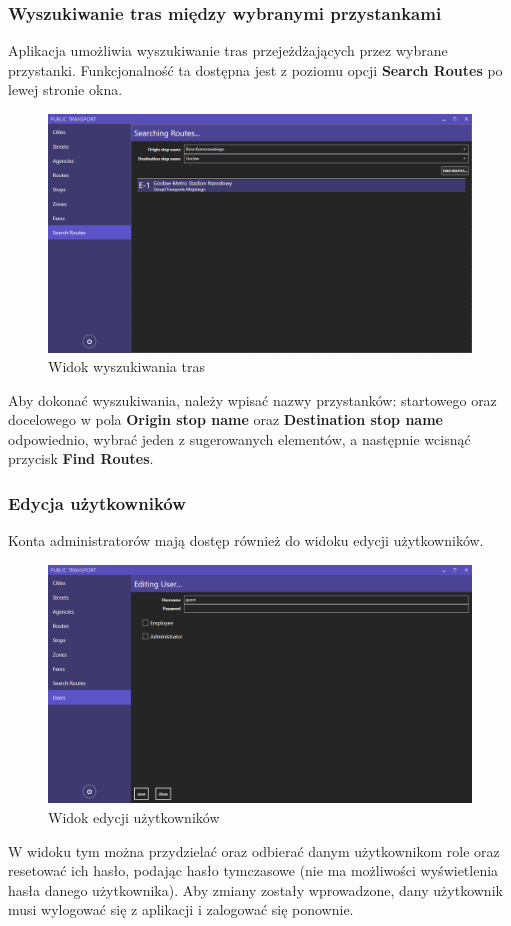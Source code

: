 \documentclass[10pt,a4paper]{article}
\begin{document}
\subsubsection{Wyszukiwanie tras między wybranymi przystankami}
Aplikacja umożliwia wyszukiwanie tras przejeżdżających przez wybrane przystanki. Funkcjonalność ta dostępna jest z poziomu opcji \textbf{Search Routes} po lewej stronie okna.
\begin{figure}[H]
	\centering
	\includegraphics[width=15cm]{screenshots/23_search_routes.PNG}
	\caption{Widok wyszukiwania tras}
\end{figure}
Aby dokonać wyszukiwania, należy wpisać nazwy przystanków: startowego oraz docelowego w pola \textbf{Origin stop name} oraz \textbf{Destination stop name} odpowiednio, wybrać jeden z sugerowanych elementów, a następnie wcisnąć przycisk \textbf{Find Routes}.

\subsubsection{Edycja użytkowników}
Konta administratorów mają dostęp również do widoku edycji użytkowników.
\begin{figure}[H]
	\centering
	\includegraphics[width=15cm]{screenshots/19_edit_user.png}
	\caption{Widok edycji użytkowników}
\end{figure}
W widoku tym można przydzielać oraz odbierać danym użytkownikom role oraz resetować ich hasło, podając hasło tymczasowe (nie ma możliwości wyświetlenia hasła danego użytkownika). Aby zmiany zostały wprowadzone, dany użytkownik musi wylogować się z aplikacji i zalogować się ponownie.
\end{document}
